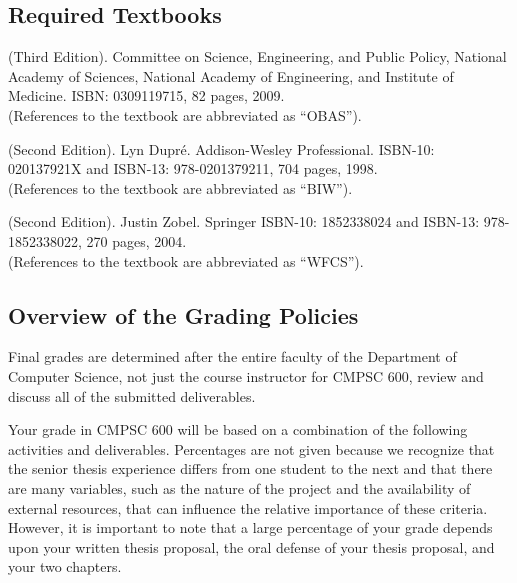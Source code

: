 \vspace{-.15in}
\subsection*{Required Textbooks}

 (Third Edition).  Committee on Science,
Engineering, and Public Policy, National Academy of Sciences, National Academy of Engineering, and Institute of
Medicine. ISBN: 0309119715, 82 pages, 2009.\\ (References to the textbook are abbreviated as ``OBAS'').

 (Second Edition). Lyn Dupr\'e.  Addison-Wesley
Professional.  ISBN-10: 020137921X and ISBN-13: 978-0201379211, 704 pages, 1998.\\ (References to the textbook are
abbreviated as ``BIW'').

 (Second Edition).  Justin Zobel.  Springer ISBN-10: 1852338024 and ISBN-13:
978-1852338022, 270 pages, 2004. \\ (References to the textbook are abbreviated as ``WFCS'').

\vspace*{-.15in}
\subsection*{Overview of the Grading Policies}

Final grades are determined after the entire faculty of the Department of Computer Science, not just the course
instructor for CMPSC 600, review and discuss all of the submitted deliverables.

Your grade in CMPSC 600 will be based on a combination of the following activities and deliverables. Percentages are not
given because we recognize that the senior thesis experience differs from one student to the next and that there are many
variables, such as the nature of the project and the availability of external resources, that can influence the relative
importance of these criteria. However, it is important to note that a large percentage of your grade depends upon your
written thesis proposal, the oral defense of your thesis proposal, and your two chapters.

\vspace*{-.05in}

